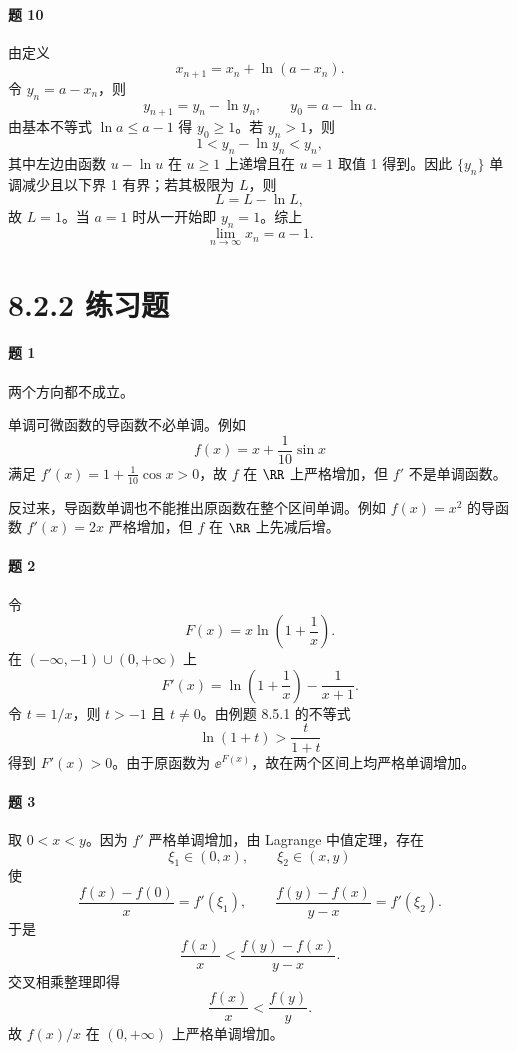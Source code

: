 \paragraph{题 10}
\begin{xsolution}
由定义
\[
  x_{n+1}=x_n+\ln(a-x_n).
\]
令 $y_n=a-x_n$，则
\[
  y_{n+1}=y_n-\ln y_n,
  \qquad y_0=a-\ln a.
\]
由基本不等式 $\ln a\le a-1$ 得 $y_0\ge1$。若 $y_n>1$，则
\[
  1<y_n-\ln y_n<y_n,
\]
其中左边由函数 $u-\ln u$ 在 $u\ge1$ 上递增且在 $u=1$ 取值 1 得到。因此 $\{y_n\}$ 单调减少且以下界 1 有界；若其极限为 $L$，则
\[
  L=L-\ln L,
\]
故 $L=1$。当 $a=1$ 时从一开始即 $y_n=1$。综上
\[
  \boxed{\lim_{n\to\infty}x_n=a-1}.
\]
\end{xsolution}

\section*{8.2.2 练习题}

\paragraph{题 1}
\begin{xsolution}
两个方向都不成立。

单调可微函数的导函数不必单调。例如
\[
  f(x)=x+\frac1{10}\sin x
\]
满足 $f'(x)=1+\frac1{10}\cos x>0$，故 $f$ 在 $\RR$ 上严格增加，但 $f'$ 不是单调函数。

反过来，导函数单调也不能推出原函数在整个区间单调。例如 $f(x)=x^2$ 的导函数 $f'(x)=2x$ 严格增加，但 $f$ 在 $\RR$ 上先减后增。
\end{xsolution}

\paragraph{题 2}
\begin{xsolution}
令
\[
  F(x)=x\ln\left(1+\frac1x\right).
\]
在 $(-\infty,-1)\cup(0,+\infty)$ 上
\[
  F'(x)=\ln\left(1+\frac1x\right)-\frac1{x+1}.
\]
令 $t=1/x$，则 $t>-1$ 且 $t\ne0$。由例题 8.5.1 的不等式
\[
  \ln(1+t)>\frac{t}{1+t}
\]
得到 $F'(x)>0$。由于原函数为 $\ee^{F(x)}$，故在两个区间上均严格单调增加。
\end{xsolution}

\paragraph{题 3}
\begin{xsolution}
取 $0<x<y$。因为 $f'$ 严格单调增加，由 Lagrange 中值定理，存在
\[
  \xi_1\in(0,x),\qquad \xi_2\in(x,y)
\]
使
\[
  \frac{f(x)-f(0)}x=f'(\xi_1),
  \qquad
  \frac{f(y)-f(x)}{y-x}=f'(\xi_2).
\]
于是
\[
  \frac{f(x)}x<\frac{f(y)-f(x)}{y-x}.
\]
交叉相乘整理即得
\[
  \frac{f(x)}x<\frac{f(y)}y.
\]
故 $f(x)/x$ 在 $(0,+\infty)$ 上严格单调增加。
\end{xsolution}

